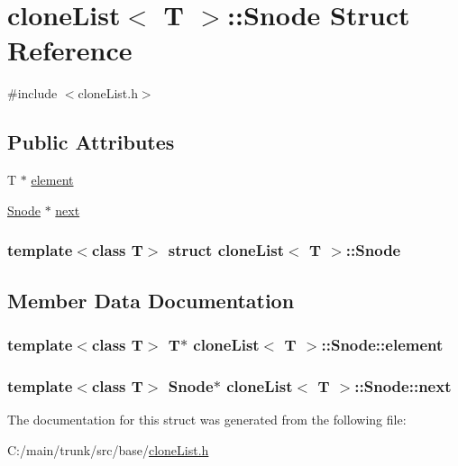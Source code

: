 \hypertarget{structclone_list_1_1_snode}{
\section{cloneList$<$ T $>$::Snode Struct Reference}
\label{structclone_list_1_1_snode}
}


{\ttfamily \#include $<$cloneList.h$>$}\subsection*{Public Attributes}
\begin{DoxyCompactItemize}
\item 
T $\ast$ \hyperlink{structclone_list_1_1_snode_a2412840369d2cf541ae998884ae1b71c}{element}
\item 
\hyperlink{structclone_list_1_1_snode}{Snode} $\ast$ \hyperlink{structclone_list_1_1_snode_a9ab3bbdb38633c7e7adff7cf970d4802}{next}
\end{DoxyCompactItemize}
\subsubsection*{template$<$class T$>$ struct cloneList$<$ T $>$::Snode}



\subsection{Member Data Documentation}
\hypertarget{structclone_list_1_1_snode_a2412840369d2cf541ae998884ae1b71c}{
\subsubsection[{element}]{\setlength{\rightskip}{0pt plus 5cm}template$<$class T$>$ T$\ast$ {\bf cloneList}$<$ T $>$::{\bf Snode::element}}}
\label{structclone_list_1_1_snode_a2412840369d2cf541ae998884ae1b71c}
\hypertarget{structclone_list_1_1_snode_a9ab3bbdb38633c7e7adff7cf970d4802}{
\subsubsection[{next}]{\setlength{\rightskip}{0pt plus 5cm}template$<$class T$>$ {\bf Snode}$\ast$ {\bf cloneList}$<$ T $>$::{\bf Snode::next}}}
\label{structclone_list_1_1_snode_a9ab3bbdb38633c7e7adff7cf970d4802}


The documentation for this struct was generated from the following file:\begin{DoxyCompactItemize}
\item 
C:/main/trunk/src/base/\hyperlink{clone_list_8h}{cloneList.h}\end{DoxyCompactItemize}
